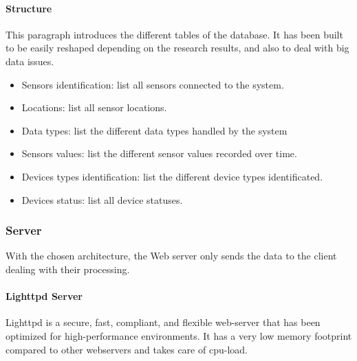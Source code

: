     
    \paragraph{Structure}
    
    This paragraph introduces the different tables of the database. It has been built to be easily reshaped depending on the research results, and also to deal with big data issues. %
    
    \begin{itemize} %
    \item Sensors identification: list all sensors connected to the system.
    \item Locations: list all sensor locations.
    \item Data types: list the different data types handled by the system
    \item Sensors values: list the different sensor values recorded over time.
    \item Devices types identification: list the different device types identificated.
    \item Devices status: list all device statuses.
    \end{itemize}
    
    
\subsubsection{Server}

    With the chosen architecture, the Web server only sends the data to the client dealing with their processing.
    
    \paragraph{Lighttpd Server}
    Lighttpd is a secure, fast, compliant, and flexible web-server that has been optimized for high-performance environments. It has a very low memory footprint compared to other webservers and takes care of cpu-load.






